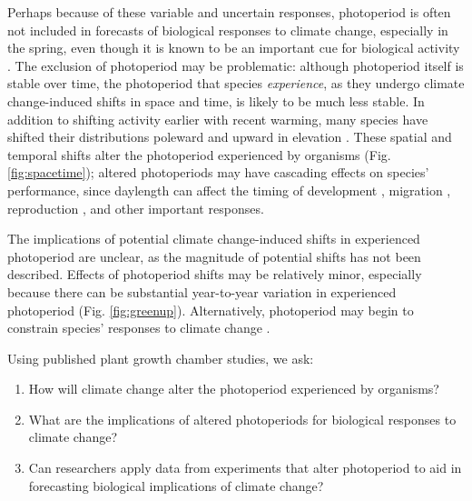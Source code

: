 \documentclass{article}
\begin{document}
\par Perhaps because of these variable and uncertain responses, photoperiod is often not included in forecasts of biological responses to climate change, especially in the spring, even though it is known to be an important cue for biological activity \citep[but see ][]{Caffarra:2011qf,duputie2015,grevstad2015}. The exclusion of photoperiod may be problematic: although photoperiod itself is stable over time, the photoperiod that species \emph{experience}, as they undergo climate change-induced shifts in space and time, is likely to be much less stable. In addition to shifting activity earlier with recent warming, many species have shifted their distributions poleward and upward in elevation \citep[i.e., range shifts,][]{chen2011,harsch2009,parmesan2006,penuelas2003}. These spatial and temporal shifts alter the photoperiod experienced by organisms (Fig. \ref{fig:spacetime}); altered photoperiods may have cascading effects on species' performance, since daylength can affect the timing of development \citep{grevstad2015,muir1994,tauber1975}, migration \citep{dawbin1966}, reproduction \citep{dunn2019,dardente2012,ben1997}, and other important responses. 

\par The implications of potential climate change-induced shifts in experienced photoperiod are unclear, as the magnitude of potential shifts has not been described. Effects of photoperiod shifts may be relatively minor, especially because there can be substantial year-to-year variation in experienced photoperiod (Fig. \ref{fig:greenup}). Alternatively, photoperiod may begin to constrain species' responses to climate change \citep{koerner2010b}.

\par Using published plant growth chamber studies, we ask: 
\begin{enumerate}
\item How will climate change alter the photoperiod experienced by organisms? 
\item What are the implications of altered photoperiods for biological responses to climate change?
\item Can researchers apply data from experiments that alter photoperiod to aid in forecasting biological implications of climate change?

\end{enumerate}
\end{document}
